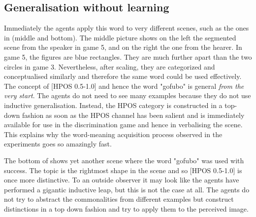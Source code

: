 \subsection{Generalisation without learning}

Immediately the agents apply this word to very 
different scenes, such as the ones in  (middle and bottom). The middle picture
shows on the left the segmented scene
from the speaker in game 5, and on the right the one
from the hearer. In game 5, the figures are blue
rectangles. They are much further apart than 
the two circles in game 3. Nevertheless, 
after scaling, they are categorized and
conceptualised similarly and therefore
the same word could be used effectively. The concept 
of [HPOS 0.5-1.0] and hence the word "gofubo" 
is general {\it from the very start}. 
The agents do not need to see many examples because they do 
not use inductive generalisation. Instead, 
the HPOS category is constructed in a top-down fashion 
as soon as the HPOS channel has been salient
and is immediately available for use in the 
discrimination game and hence in verbalising 
the scene. This explains why the word-meaning acquisition
process observed in the experiments goes so 
amazingly fast.

The bottom of 
shows yet another scene where the word "gofubo" 
was used with success. The topic is the rightmost
shape in the scene and so [HPOS 0.5-1.0] is once more 
distinctive. To an outside observer it may look 
like the agents have performed a gigantic inductive
leap, but this is not the case at all. The agents
do not try to abstract the commonalities from 
different examples but construct distinctions in a top 
down fashion and try to apply them to the perceived image. 

